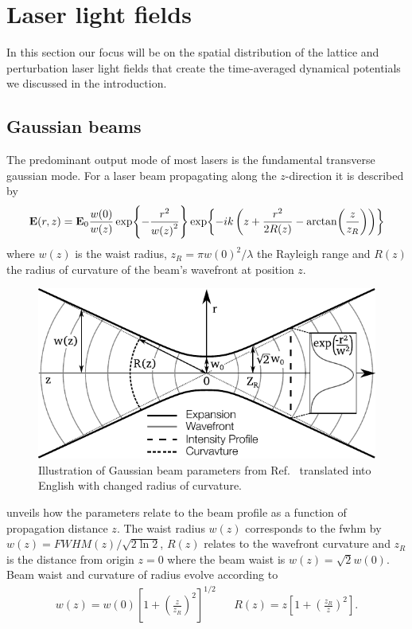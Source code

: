 \section{Laser light fields}

In this section our focus will be on the spatial distribution of the lattice
and perturbation laser light fields that create the time-averaged dynamical
potentials we discussed in the introduction.

\subsection{Gaussian beams}

The predominant output mode of most lasers is the fundamental transverse
gaussian mode. For a laser beam propagating along the $z$-direction it is
described by
\begin{equation}
  \vb{E}(r,z)
  =
  \vb{E}_0\frac{w(0)}{w(z)}
  \exp{-\frac{r^2}{w{(z)}^2}}
  \exp{-ik\left(z+\frac{r^2}{2R(z)}-\arctan(\frac{z}{z_R})\right)}
  \label{eq:gaussian_beam}
\end{equation}
where $w{(z)}$ is the waist radius, $z_R=\pi w{(0)}^2/\lambda$ the Rayleigh
range and $R(z)$ the radius of curvature of the beam's wavefront at position
$z$.
\begin{figure}[htb]
  \centering
  \includegraphics[width=\textwidth]{../media/image/gaussian-beam.pdf}
  \caption{Illustration of Gaussian beam parameters from Ref.~\cite{Aleph2014}
    translated into English with changed radius of curvature.
  }\label{fig:gaussian_beam}
\end{figure}
 unveils how the parameters relate to the beam
profile as a function of propagation distance $z$. The waist radius $w(z)$
corresponds to the \gls{fwhm} by $w(z)=FWHM(z)/\sqrt{2\ln2}$, $R(z)$ relates
to the wavefront curvature and $z_R$ is the distance from origin $z=0$ where
the beam waist is $w(z)=\sqrt{2}w(0)$. Beam waist and curvature of radius
evolve according to
\begin{align}
  w{(z)}
  =
  w{(0)}{\left[1+{\left(\frac{z}{z_R}\right)}^2\right]}^{1/2}
  &&
  R{(z)}=z{\left[1+{\left(\frac{z_R}{z}\right)}^2\right]}
  \label{eq:gaussian_beam_evolvement}.
\end{align}

